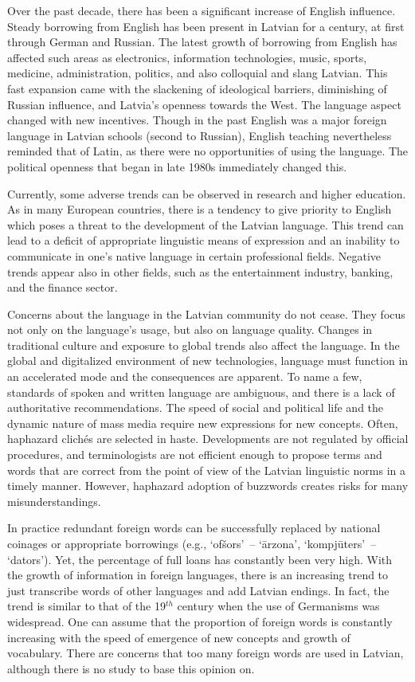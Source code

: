 \begin{multicols}{2}
Over the past decade, there has been a significant increase of English influence.
Steady borrowing from English has been present in Latvian for a century, at first through German and Russian.
The latest growth of borrowing from English has affected such areas as electronics, information technologies, music, sports, medicine, administration, politics, and also colloquial and slang Latvian.
This fast expansion came with the slackening of ideological barriers, diminishing of Russian influence, and Latvia's openness towards the West.
The language aspect changed with new incentives.
Though in the past English was a major foreign language in Latvian schools (second to Russian), English teaching nevertheless reminded that of Latin, as there were no opportunities of using the language.
The political openness that began in late 1980s immediately changed this.

Currently, some adverse trends can be observed in research and higher education.
As in many European countries, there is a tendency to give priority to English which poses a threat to the development of the Latvian language.
This trend can lead to a deficit of appropriate linguistic means of expression and an inability to communicate in one's native language in certain professional fields.
Negative trends appear also in other fields, such as the entertainment industry, banking, and the finance sector.

Concerns about the language in the Latvian community do not cease.
They focus not only on the language's usage, but also on language quality.
Changes in traditional culture and exposure to global trends also affect the language.
In the global and digitalized environment of new technologies, language must function in an accelerated mode and the consequences are apparent.
To name a few, standards of spoken and written language are ambiguous, and there is a lack of authoritative recommendations.
The speed of social and political life and the dynamic nature of mass media require new expressions for new concepts.
Often, haphazard clichés are selected in haste.
Developments are not regulated by official procedures, and terminologists are not efficient enough to propose terms and words that are correct from the point of view of the Latvian linguistic norms in a timely manner.
However, haphazard adoption of buzzwords creates risks for many misunderstandings.

In practice redundant foreign words can be successfully replaced by national coinages or appropriate borrowings (e.g., `ofšors'~-- `ārzona', `kompjūters'~-- `dators').
Yet, the percentage of full loans has constantly been very high.
With the growth of information in foreign languages, there is an increasing trend to just transcribe words of other languages and add Latvian endings.
In fact, the trend is similar to that of the 19${}^{th}$ century when the use of Germanisms was widespread.
One can assume that the proportion of foreign words is constantly increasing with the speed of emergence of new concepts and growth of vocabulary.
There are concerns that too many foreign words are used in Latvian, although there is no study to base this opinion on.


\end{multicols}
